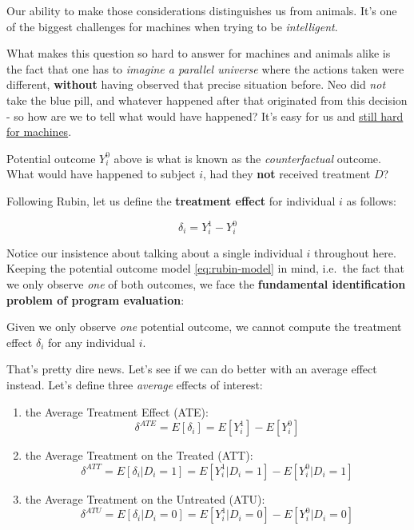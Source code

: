 \documentclass[]{book}
\providecommand{\tightlist}{%
  \setlength{\itemsep}{0pt}\setlength{\parskip}{0pt}}
\newenvironment{warning}{\begin{tcolorbox}[colback=orange!5!white,colframe=orange]}{\end{tcolorbox}}
\begin{document}
Our ability to make those considerations distinguishes us from animals. It's one of the biggest challenges for machines when trying to be \emph{intelligent}.

What makes this question so hard to answer for machines and animals alike is the fact that one has to \emph{imagine a parallel universe} where the actions taken were different, \textbf{without} having observed that precise situation before. Neo did \emph{not} take the blue pill, and whatever happened after that originated from this decision - so how are we to tell what would have happened? It's easy for us and \href{https://www.quantamagazine.org/to-build-truly-intelligent-machines-teach-them-cause-and-effect-20180515/}{still hard for machines}.

Potential outcome \(Y_i^0\) above is what is known as the \emph{counterfactual} outcome. What would have happened to subject \(i\), had they \textbf{not} received treatment \(D\)?

Following Rubin, let us define the \textbf{treatment effect} for individual \(i\) as follows:

\begin{equation}
\delta_i = Y_i^1 - Y_i^0 \label{eq:TE}
\end{equation}

Notice our insistence about talking about a single individual \(i\) throughout here. Keeping the potential outcome model \eqref{eq:rubin-model} in mind, i.e.~the fact that we only observe \emph{one} of both outcomes, we face the \textbf{fundamental identification problem of program evaluation}:

\begin{warning}
Given we only observe \emph{one} potential outcome, we cannot compute
the treatment effect \(\delta_i\) for any individual \(i\).
\end{warning}

That's pretty dire news. Let's see if we can do better with an average effect instead. Let's define three \emph{average} effects of interest:

\begin{enumerate}
\def\labelenumi{\arabic{enumi}.}
\tightlist
\item
  the Average Treatment Effect (ATE): \[\delta^{ATE} = E[\delta_i] = E[Y_i^1] - E[Y_i^0]\]
\item
  the Average Treatment on the Treated (ATT): \[\delta^{ATT} = E[\delta_i|D_i = 1] = E[Y_i^1|D_i = 1] - E[Y_i^0|D_i = 1]\]
\item
  the Average Treatment on the Untreated (ATU): \[\delta^{ATU} = E[\delta_i|D_i = 0] = E[Y_i^1|D_i = 0] - E[Y_i^0|D_i = 0]\]
\end{enumerate}
\end{document}
